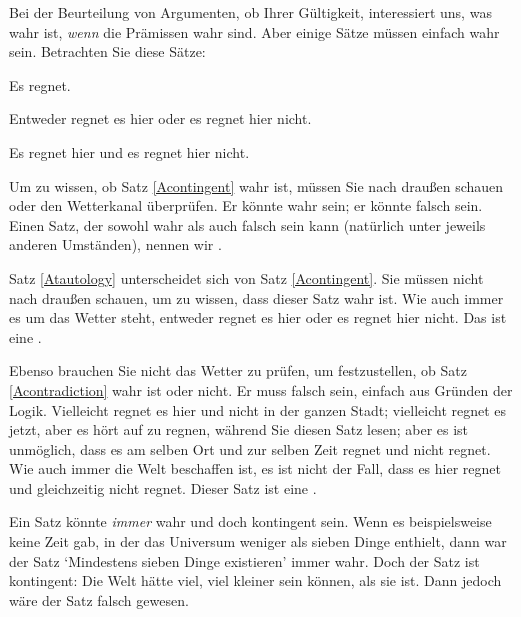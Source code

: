 Bei der Beurteilung von Argumenten, ob Ihrer Gültigkeit, interessiert uns, was wahr ist, \emph{wenn} die Prämissen wahr sind. Aber einige Sätze müssen einfach wahr sein. Betrachten Sie diese Sätze:
	\begin{earg}
		\item[\ex{Acontingent}] Es regnet.
		\item[\ex{Atautology}] Entweder regnet es hier oder es regnet hier nicht.
		\item[\ex{Acontradiction}] Es regnet hier und es regnet hier nicht.
	\end{earg}
Um zu wissen, ob Satz \ref{Acontingent} wahr ist, müssen Sie nach drau{\ss}en schauen oder den Wetterkanal überprüfen. Er könnte wahr sein; er könnte falsch sein. Einen Satz, der sowohl wahr als auch falsch sein kann (natürlich unter jeweils anderen Umständen), nennen wir .


Satz \ref{Atautology} unterscheidet sich von Satz \ref{Acontingent}. Sie müssen nicht nach drau{\ss}en schauen, um zu wissen, dass dieser Satz wahr ist. Wie auch immer es um das Wetter steht, entweder regnet es hier oder es regnet hier nicht. Das ist eine . 


Ebenso brauchen Sie nicht das Wetter zu prüfen, um festzustellen, ob Satz \ref{Acontradiction} wahr ist oder nicht. Er muss falsch sein, einfach aus Gründen der Logik. Vielleicht regnet es hier und nicht in der ganzen Stadt; vielleicht regnet es jetzt, aber es hört auf zu regnen, während Sie diesen Satz lesen; aber es ist unmöglich, dass es am selben Ort und zur selben Zeit regnet und nicht regnet. Wie auch immer die Welt beschaffen ist, es ist nicht der Fall, dass es hier regnet und gleichzeitig nicht regnet. Dieser Satz ist eine .


Ein Satz könnte \emph{immer} wahr und doch kontingent sein. Wenn es beispielsweise keine Zeit gab, in der das Universum weniger als sieben Dinge enthielt, dann war der Satz `Mindestens sieben Dinge existieren' immer wahr. Doch der Satz ist kontingent: Die Welt hätte viel, viel kleiner sein können, als sie ist. Dann jedoch wäre der Satz falsch gewesen. 


